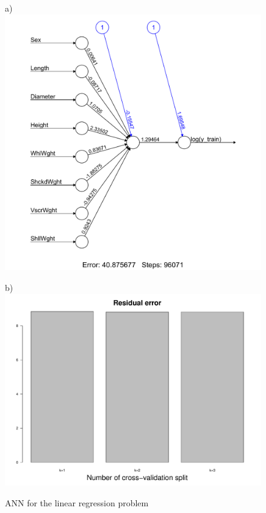 \documentclass[10pt, paper=a4]{article}
\begin{document}
\newpage
\begin{figure}[h]
  \centering
  \begin{minipage}{0.49\textwidth}
  a)\\
  \includegraphics[width = 0.99\textwidth]{ANN_LR.pdf}
\end{minipage} \hfill
	 \begin{minipage}{0.49\textwidth}
  b)\\
  \includegraphics[width = 0.99\textwidth]{ANN_LR_Error.pdf}
\end{minipage} \vfill
  \caption{ANN for the linear regression problem}
  \label{fig:ann_lr}
\end{figure}
\end{document}
